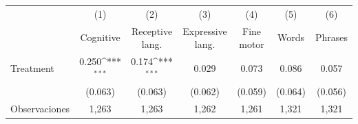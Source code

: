 {
\def\sym#1{\ifmmode^{#1}\else\(^{#1}\)\fi}
\begin{tabular}{l*{6}{c}}
\toprule
                    &\multicolumn{1}{c}{(1)}&\multicolumn{1}{c}{(2)}&\multicolumn{1}{c}{(3)}&\multicolumn{1}{c}{(4)}&\multicolumn{1}{c}{(5)}&\multicolumn{1}{c}{(6)}\\
                    &\multicolumn{1}{c}{Cognitive}&\multicolumn{1}{c}{Receptive lang.}&\multicolumn{1}{c}{Expressive lang.}&\multicolumn{1}{c}{Fine motor}&\multicolumn{1}{c}{Words}&\multicolumn{1}{c}{Phrases}\\
\midrule
Treatment           &       0.250\sym{***}&       0.174\sym{***}&       0.029         &       0.073         &       0.086         &       0.057         \\
                    &     (0.063)         &     (0.063)         &     (0.062)         &     (0.059)         &     (0.064)         &     (0.056)         \\
\midrule
Observaciones       &       1,263         &       1,263         &       1,262         &       1,261         &       1,321         &       1,321         \\
\bottomrule
\end{tabular}
}
